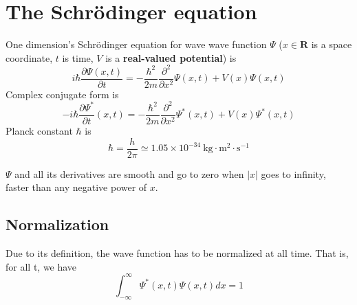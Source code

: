 \section{The Schrödinger equation}

One dimension's Schrödinger equation for wave wave function $\Psi$ ($x \in \mathbf{R}$ is a space coordinate, $t$ is time, $V$ is a \textbf{real-valued potential}) is
\begin{equation}\boxed{
        i \hbar \frac{\partial \Psi(x, t)}{\partial t}=-\frac{\hbar^{2}}{2 m} \frac{\partial^{2}}{\partial x^{2}} \Psi(x, t)+V(x) \Psi(x, t)}\label{eq1}
\end{equation}
Complex conjugate form is
\begin{equation}\boxed{
        -i \hbar \frac{\partial \Psi^{*}}{\partial t}(x, t)=-\frac{\hbar^{2}}{2 m} \frac{\partial^{2}}{\partial x^{2}} \Psi^{*}(x, t)+V(x) \Psi^{*}(x, t)}\label{eq2}
\end{equation}
Planck constant $\hbar$ is
$$
    \hbar=\frac{h}{2 \pi} \simeq 1.05 \times 10^{-34} \mathrm{~kg} \cdot \mathrm{m}^{2} \cdot \mathrm{s}^{-1}
$$
\begin{assumption}\label{ass1}
    $\Psi$ and all its derivatives are smooth and go to zero when $|x|$ goes to infinity, faster than any negative power of $x$.
\end{assumption}

\subsection{Normalization}
Due to its definition, the wave function has to be normalized at all time. That is, for all t, we have
\begin{equation}\boxed{
        \int_{-\infty}^{\infty} \Psi^{*}(x, t) \Psi(x, t) d x=1}\label{eq3}
\end{equation}

